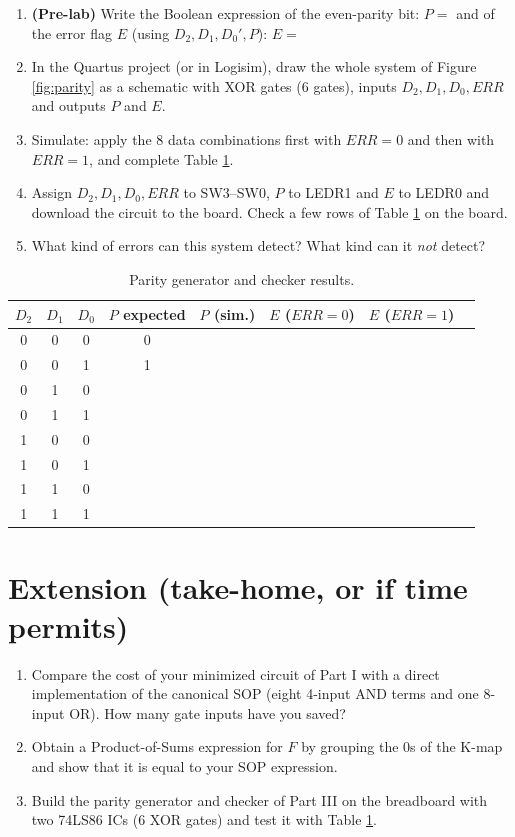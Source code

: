 \documentclass{article}
\begin{document}
\begin{enumerate}
    \item[(a)] \textbf{(Pre-lab)} Write the Boolean expression of the even-parity bit: $P = $ \underline{\hspace{5cm}} and of the error flag $E$ (using $D_2, D_1, D_0', P$): $E = $ \underline{\hspace{5cm}}
    \item[(b)] In the Quartus project (or in Logisim), draw the whole system of Figure \ref{fig:parity} as a schematic with XOR gates (6 gates), inputs $D_2, D_1, D_0, ERR$ and outputs $P$ and $E$.
    \item[(c)] Simulate: apply the 8 data combinations first with $ERR=0$ and then with $ERR=1$, and complete Table \ref{tab:parity}.
    \item[(d)] Assign $D_2, D_1, D_0, ERR$ to SW3--SW0, $P$ to LEDR1 and $E$ to LEDR0 and download the circuit to the board. Check a few rows of Table \ref{tab:parity} on the board.
    \item[(e)] What kind of errors can this system detect? What kind can it \emph{not} detect?
\end{enumerate}

\begin{table}[H]
    \centering
    \begin{tabular}{|c|c|c|c|c|c|c|c|}
        \hline
        $D_2$ & $D_1$ & $D_0$ & $P$ expected & $P$ (sim.) & $E$ ($ERR=0$) & $E$ ($ERR=1$) \\
        \hline
        0 & 0 & 0 & 0 & & & \\
        0 & 0 & 1 & 1 & & & \\
        0 & 1 & 0 & & & & \\
        0 & 1 & 1 & & & & \\
        1 & 0 & 0 & & & & \\
        1 & 0 & 1 & & & & \\
        1 & 1 & 0 & & & & \\
        1 & 1 & 1 & & & & \\
        \hline
    \end{tabular}
    \caption{Parity generator and checker results.}
    \label{tab:parity}
\end{table}

\section*{Extension (take-home, or if time permits)}
\begin{enumerate}
    \item Compare the cost of your minimized circuit of Part I with a direct implementation of the canonical SOP (eight 4-input AND terms and one 8-input OR). How many gate inputs have you saved?
    \item Obtain a Product-of-Sums expression for $F$ by grouping the 0s of the K-map and show that it is equal to your SOP expression.
    \item Build the parity generator and checker of Part III on the breadboard with two 74LS86 ICs (6 XOR gates) and test it with Table \ref{tab:parity}.
\end{enumerate}
\end{document}
